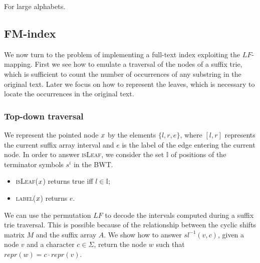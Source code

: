 For large alphabets.

\subsection{FM-index}

We now turn to the problem of implementing a full-text index exploiting the $LF$-mapping.
First we see how to emulate a traversal of the nodes of a suffix trie, which is sufficient to count the number of occurrences of any substring in the original text.
Later we focus on how to represent the leaves, which is necessary to locate the occurrences in the original text.

\label{sub:fmi}
\subsubsection{Top-down traversal}

We represent the pointed node $x$ by the elements $\{ l, r, e \}$, where $[l,r]$ represents the current suffix array interval and $e$ is the label of the edge entering the current node.
In order to answer \textsc{isLeaf}, we consider the set $\mathbb{I}$ of positions of the terminator symbols $s^i$ in the BWT.
\begin{itemize}
\item \textsc{isLeaf}($x$) returns true iff $l \in \mathbb{I}$;
\item \textsc{label}($x$) returns $e$.
\end{itemize}

We can use the permutation $LF$ to decode the intervals computed during a suffix trie traversal.
This is possible because of the relationship between the cyclic shifts matrix $M$ and the suffix array $A$.
We show how to answer $sl^{-1}(v,c)$, \ie given a node $v$ and a character $c \in \Sigma$, return the node $w$ such that $repr(w) = c \cdot repr(v)$.

